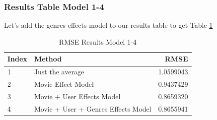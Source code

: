 \documentclass[
]{article}
\newenvironment{Shaded}{}{}
\newcommand{\AttributeTok}[1]{\textcolor[rgb]{0.49,0.56,0.16}{#1}}
\newcommand{\DecValTok}[1]{\textcolor[rgb]{0.25,0.63,0.44}{#1}}
\newcommand{\FloatTok}[1]{\textcolor[rgb]{0.25,0.63,0.44}{#1}}
\newcommand{\FunctionTok}[1]{\textcolor[rgb]{0.02,0.16,0.49}{#1}}
\newcommand{\NormalTok}[1]{#1}
\newcommand{\OtherTok}[1]{\textcolor[rgb]{0.00,0.44,0.13}{#1}}
\newcommand{\SpecialCharTok}[1]{\textcolor[rgb]{0.25,0.44,0.63}{#1}}
\newcommand{\StringTok}[1]{\textcolor[rgb]{0.25,0.44,0.63}{#1}}
\begin{document}
\begin{Shaded}
\end{Shaded}

\newpage

\hypertarget{results-table-model-1-4}{%
\subsubsection{Results Table Model 1-4}\label{results-table-model-1-4}}

Let's add the genres effects model to our results table to get Table
\ref{tbl:rmse_results_model_1-4}

\begin{table}[H]

\caption{\label{tab:ge_7}RMSE Results Model 1-4\label{tbl:rmse_results_model_1-4}}
\centering
\fontsize{7}{9}\selectfont
\begin{tabular}[t]{llr}
\toprule
Index & Method & RMSE\\
\midrule
1 & Just the average & 1.0599043\\
2 & Movie Effect Model & 0.9437429\\
3 & Movie + User Effects Model & 0.8659320\\
4 & Movie + User + Genres Effects Model & 0.8655941\\
\bottomrule
\end{tabular}
\end{table}
\end{document}
